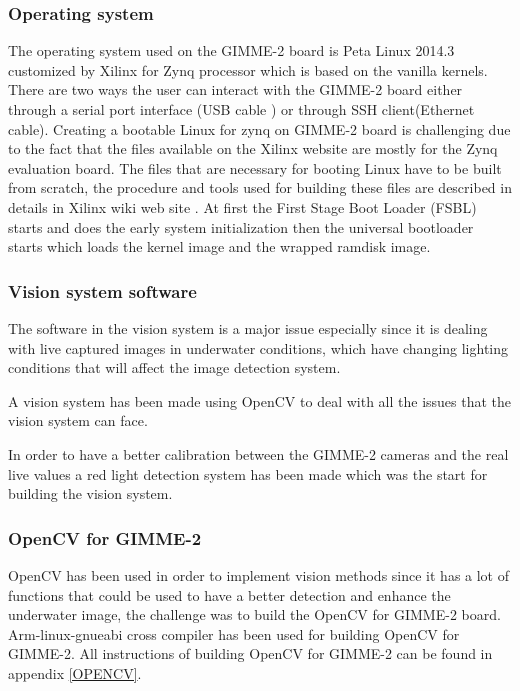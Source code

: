 \subsubsection{Operating system}
The operating system used on the GIMME-2 board is Peta Linux 2014.3 customized by Xilinx for Zynq processor which is based on the vanilla kernels. There are two ways the user can interact with the GIMME-2 board either through a serial port interface (USB cable ) or through SSH client(Ethernet cable).
Creating  a bootable Linux for zynq on GIMME-2 board  is challenging due to the fact that the files available on the Xilinx website are mostly for the Zynq evaluation board. The files that are necessary for booting Linux have to be built from scratch, the procedure and tools used for building these files are described in details in Xilinx wiki web site \cite{xilinxuserguide}. 
At first the First Stage Boot Loader (FSBL) starts and does the early system initialization then the universal bootloader starts which loads the kernel image and the wrapped ramdisk image.

\subsubsection{Vision system software}
The software in the vision system is a major issue especially since it is dealing with live captured images in underwater conditions, which have changing lighting conditions that will affect the image detection system.

A vision system has been made using OpenCV to deal with all the issues that the vision system can face. 

In order to have a better calibration between the GIMME-2 cameras and the real live values a red light detection system has been made which was the start for building  the vision system.

\subsubsection{OpenCV for GIMME-2}
OpenCV has been used in order to implement vision methods  since it has a lot of functions that could be used to have a better detection and  enhance the underwater image, the challenge was to build the OpenCV for GIMME-2 board. Arm-linux-gnueabi cross compiler has been used for building OpenCV for GIMME-2. All instructions of building OpenCV for GIMME-2 can be found in appendix \ref{OPENCV}.

